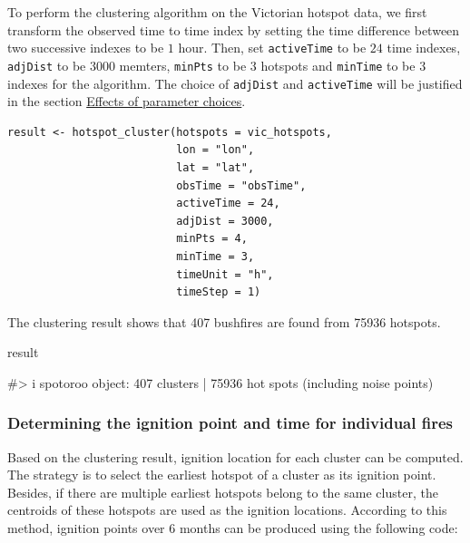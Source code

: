 To perform the clustering algorithm on the Victorian hotspot data, we
first transform the observed time to time index by setting the time
difference between two successive indexes to be \(1\) hour. Then, set
\texttt{activeTime} to be \(24\) time indexes, \texttt{adjDist} to be
\(3000\) memters, \texttt{minPts} to be \(3\) hotspots and
\texttt{minTime} to be \(3\) indexes for the algorithm. The choice of
\texttt{adjDist} and \texttt{activeTime} will be justified in the
section \protect\hyperlink{effects-of-parameter-choices}{Effects of
parameter choices}.

\begin{verbatim}
result <- hotspot_cluster(hotspots = vic_hotspots,
                          lon = "lon",
                          lat = "lat",
                          obsTime = "obsTime",
                          activeTime = 24,
                          adjDist = 3000,
                          minPts = 4,
                          minTime = 3,
                          timeUnit = "h",
                          timeStep = 1)
\end{verbatim}

The clustering result shows that 407 bushfires are found from 75936
hotspots.

\begin{Schunk}
\begin{Sinput}
result
\end{Sinput}
\begin{Soutput}
#> i spotoroo object: 407 clusters | 75936 hot spots (including noise points)
\end{Soutput}
\end{Schunk}

\hypertarget{determining-the-ignition-point-and-time-for-individual-fires}{%
\subsubsection{Determining the ignition point and time for individual
fires}\label{determining-the-ignition-point-and-time-for-individual-fires}}

Based on the clustering result, ignition location for each cluster can
be computed. The strategy is to select the earliest hotspot of a cluster
as its ignition point. Besides, if there are multiple earliest hotspots
belong to the same cluster, the centroids of these hotspots are used as
the ignition locations. According to this method, ignition points over 6
months can be produced using the following code:

